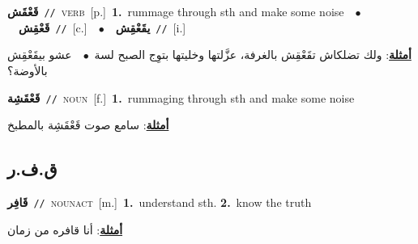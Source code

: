 \documentclass[10pt,a4paper,twoside]{article} %
\begin{document}
\begin{multicols}{2}
{\setlength\topsep{0pt}\textbf{\foreignlanguage{arabic}{قَعْقَش}}\ {\color{gray}\texttt{//}\color{black}}\ \textsc{verb}\ [p.]\ \textbf{1.}~rummage through sth and make some noise\ \ $\bullet$\ \ \setlength\topsep{0pt}\textbf{\foreignlanguage{arabic}{قَعْقِش}}\ {\color{gray}\texttt{//}\color{black}}\ [c.]\ \ $\bullet$\ \ \setlength\topsep{0pt}\textbf{\foreignlanguage{arabic}{يقَعْقِش}}\ {\color{gray}\texttt{//}\color{black}}\ [i.]\  \begin{flushright}\color{gray}\foreignlanguage{arabic}{\textbf{\underline{\foreignlanguage{arabic}{أمثلة}}}: ولك تضلكاش تقَعْقِش بالغرفة، عزَّلتها وخليتها بتوِج الصبح لسة\ $\bullet$\ \  عشو بيقَعْقِش بالأوضة؟}\end{flushright}\color{black}} \vspace{2mm}

{\setlength\topsep{0pt}\textbf{\foreignlanguage{arabic}{قَعْقَشِة}}\ {\color{gray}\texttt{//}\color{black}}\ \textsc{noun}\ [f.]\ \textbf{1.}~rummaging through sth and make some noise\  \begin{flushright}\color{gray}\foreignlanguage{arabic}{\textbf{\underline{\foreignlanguage{arabic}{أمثلة}}}: سامع صوت قَعْقَشِة بالمطبخ}\end{flushright}\color{black}} \vspace{2mm}

\vspace{-3mm}
\subsection*{\color{blue}\foreignlanguage{arabic}{ق.ف.ر}\color{blue}{}} 

{\setlength\topsep{0pt}\textbf{\foreignlanguage{arabic}{قَافِر}}\ {\color{gray}\texttt{//}\color{black}}\ \textsc{noun\textunderscore act}\ [m.]\ \textbf{1.}~understand sth.  \textbf{2.}~know the truth\  \begin{flushright}\color{gray}\foreignlanguage{arabic}{\textbf{\underline{\foreignlanguage{arabic}{أمثلة}}}: أنا قافره من زمان}\end{flushright}\color{black}} \vspace{2mm}


\end{multicols}
\end{document}
